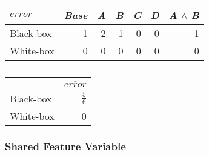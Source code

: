     \begin{table}[H]
        \begin{minipage}{.5\linewidth}
            \centering
            \begin{tabular}{lrrrrrr}    \toprule
            $error$    & \emph{Base} & \emph{A} & \emph{B} & \emph{C} & \emph{D} & \emph{A} $\land$ \emph{B}   \\ \midrule
            Black-box & 1 & 2 & 1 & 0 & 0 & 1      \\
            White-box & 0 & 0 & 0 & 0 & 0 & 0      \\ \bottomrule
            \end{tabular}
            \caption{}
        \end{minipage}%
        \hspace{7mm}
        \begin{minipage}{.3\linewidth}
            \centering
            \begin{tabular}{lr}
                \toprule
                          & $\overline{error}$   \\ \midrule
                Black-box & $\frac{5}{6}$              \\
                White-box & 0              \\ \bottomrule
                \end{tabular}
                \caption{}
            \end{minipage}
        \end{table}

        \subsubsection*{Shared Feature Variable} %

